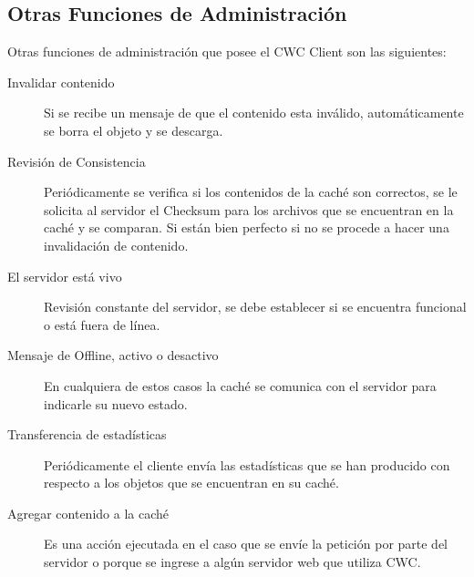 \subsection{Otras Funciones de Administración}
Otras funciones de administración que posee el CWC Client son las siguientes:
\begin{description}
\item[Invalidar contenido] Si se recibe un mensaje de que el contenido esta inválido, automáticamente se borra el objeto y se descarga.

\item [Revisión de Consistencia] Periódicamente se verifica si los contenidos de la caché son correctos, se le solicita al servidor el Checksum para los archivos que se encuentran en la caché y se comparan. Si están bien perfecto si no se procede a hacer una invalidación de contenido.

\item [El servidor está vivo] Revisión constante del servidor, se debe establecer si se encuentra funcional o está fuera de línea.

\item [Mensaje de Offline, activo o desactivo] En cualquiera de estos casos la caché se comunica con el servidor para indicarle su nuevo estado.

\item [Transferencia de estadísticas] Periódicamente el cliente envía las estadísticas que se han producido con respecto a los objetos que se encuentran en su caché. 

\item [Agregar contenido a la caché] Es una acción ejecutada en el caso que se envíe la petición por parte del servidor o porque se ingrese a algún servidor web que utiliza CWC.
\end{description}
